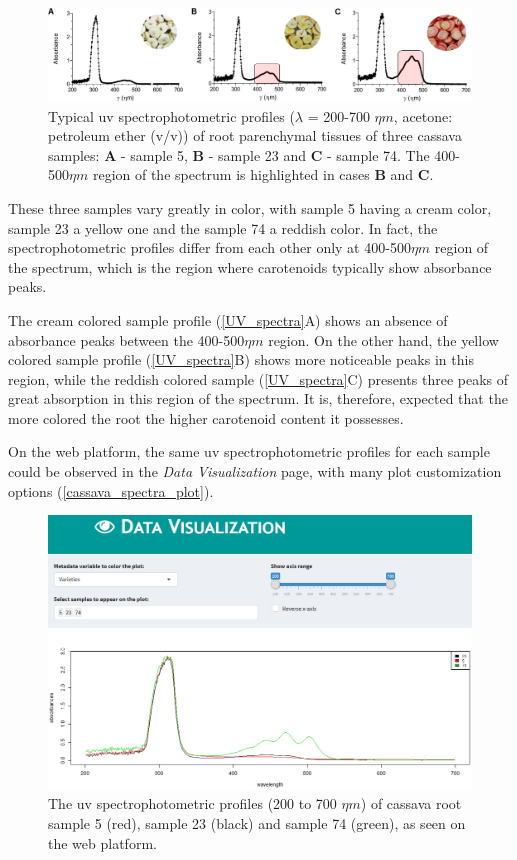 \begin{figure}[h]
	\centering
	\includegraphics[width=1\linewidth]{Imagens/Case_study/UV_spectra_2}
	\caption{Typical \gls{uv} spectrophotometric profiles ($ \lambda $ = 200-700 $\eta m$, acetone: petroleum ether (v/v)) of root parenchymal tissues of three cassava samples: \textbf{A} - sample 5, \textbf{B} - sample 23 and \textbf{C} - sample 74. The 400-500$\eta m$ region of the spectrum is highlighted in cases \textbf{B} and \textbf{C}.}
	\label{UV_spectra}
\end{figure}

These three samples vary greatly in color, with sample 5 having a cream color, sample 23 a yellow one and the sample 74 a reddish color. In fact, the spectrophotometric profiles differ from each other only at 400-500$\eta m$ region of the spectrum, which is the region where carotenoids typically show absorbance peaks. 

The cream colored sample profile (\autoref{UV_spectra}A) shows an absence of absorbance peaks between the 400-500$\eta m$ region. On the other hand, the yellow colored sample profile (\autoref{UV_spectra}B) shows more noticeable peaks in this region, while the reddish colored sample (\autoref{UV_spectra}C) presents three peaks of great absorption in this region of the spectrum. It is, therefore, expected that the more colored the root the higher carotenoid content it possesses.

On the web platform, the same \gls{uv} spectrophotometric profiles for each sample could be observed in the \textit{Data Visualization} page, with many plot customization options (\autoref{cassava_spectra_plot}).


\begin{figure}[H]
	\centering
	\includegraphics[width=0.8\linewidth]{Imagens/Case_study/spectra_plot}
	\caption{The \gls{uv} spectrophotometric profiles (200 to 700 $\eta m$) of cassava root sample 5 (red), sample 23 (black) and sample 74 (green), as seen on the web platform.}
	\label{cassava_spectra_plot}
\end{figure}



